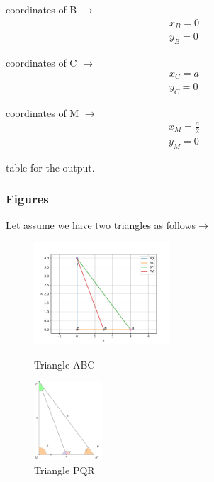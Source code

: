 \documentclass{beamer}
\begin{document}
	  	\begin{frame}
	  		\begin{multicols}{2}
	  				coordinates of B $\to$
	  			\begin{align}
	  			x_B = 0       		
	  			\\
	  			y_B = 0
	  			\end{align}
	  			
	  			coordinates of C $\to$
	  			\begin{align}
	  			x_C = a      		
	  			\\
	  			y_C = 0
	  			\end{align}
	  			
	  			coordinates of M $\to$
	  			\begin{align}
	  			x_M = \frac{a}{2}       		
	  			\\
	  			y_M = 0
	  			\end{align}
	  			
	  			
	  			\begin{table}[h!]
	  				\begin{center}
	  					\caption{table for the output.}
	  					\label{tab:table1}
	  								
	  				\end{center}
	  			\end{table}
	  			
	  		\end{multicols}
	  	\end{frame}
  	
	    \begin{frame}    	
			\frametitle{Figures}
	    		 Let assume we have two triangles as follows$\to$\\
	    		 
	    	\begin{figure}[!htb]
	    		\begin{minipage}{0.48\textwidth}
	    			\centering
	    			\includegraphics[width=2.0in]{./codes/triangle.pdf}
	    			\caption{Triangle ABC}
	    			\label{fig:triangle}
	    		\end{minipage}
	    		\hfill
	    		\begin{minipage}{0.48\textwidth}
	    			\centering
	    			\includegraphics[width=1.0in]{./figures/congurentpicabc2.pdf}
	    			\caption{Triangle PQR}
	    			\label{fig:triangle2}
	    		\end{minipage}	
	    	\end{figure}
	    \end{frame}   
        
\end{document}
